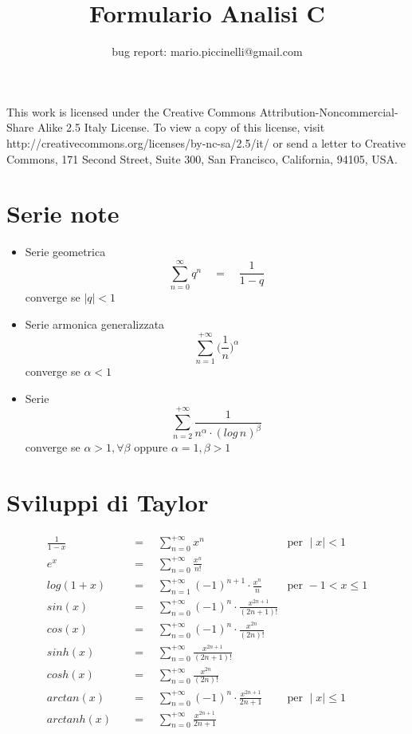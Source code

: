 \documentclass[a4paper,10pt,italian]{article}
\title{Formulario Analisi C}
\author{bug report: mario.piccinelli@gmail.com}
\date{}
\begin{document}
\maketitle

This work is licensed under the Creative Commons Attribution-Noncommercial-Share Alike 2.5 Italy License. To view a copy of this license, visit http://creativecommons.org/licenses/by-nc-sa/2.5/it/ or send a letter to Creative Commons, 171 Second Street, Suite 300, San Francisco, California, 94105, USA.

\section{Serie note}
\begin{itemize}
\item Serie geometrica
$$ \sum_{n=0}^{\infty} q^n \quad = \quad \frac{1}{1-q} $$
converge se $\mid q \mid < 1$
\item Serie armonica generalizzata
$$ \sum_{n=1}^{+\infty} \Bigr( \frac{1}{n} \Bigr) ^\alpha $$
converge se $\alpha < 1$
\item Serie
$$ \sum_{n=2}^{+\infty} \frac{1}{n^\alpha \cdot (log \, n)^\beta} $$ 
converge se $\alpha > 1, \forall \beta$ oppure $\alpha=1, \beta>1$
\end{itemize}

\section{Sviluppi di Taylor}
\begin{align*}
\frac{1}{1-x} \quad &= \quad \sum_{n=0}^{+\infty}x^n &\mbox{per }\mid x \mid < 1 \\
e^x \quad &= \quad \sum_{n=0}^{+\infty}\frac{x^n}{n!} \\
log(1+x) \quad &= \quad \sum_{n=1}^{+\infty}(-1)^{n+1}\cdot\frac{x^n}{n} &\mbox{per } -1<x\leq 1 \\
sin(x) \quad &= \quad \sum_{n=0}^{+\infty}(-1)^n\cdot\frac{x^{2n+1}}{(2n+1)!} \\
cos(x) \quad &= \quad \sum_{n=0}^{+\infty}(-1)^n\cdot\frac{x^{2n}}{(2n)!} \\
sinh(x) \quad &= \quad \sum_{n=0}^{+\infty}\frac{x^{2n+1}}{(2n+1)!} \\
cosh(x) \quad &= \quad \sum_{n=0}^{+\infty}\frac{x^{2n}}{(2n)!} \\
arctan(x) \quad &= \quad \sum_{n=0}^{+\infty}(-1)^n\cdot\frac{x^{2n+1}}{2n+1} &\mbox{per }\mid x \mid \leq 1\\
arctanh(x) \quad &= \quad \sum_{n=0}^{+\infty}\frac{x^{2n+1}}{2n+1} \\
\end{align*}
\end{document}
